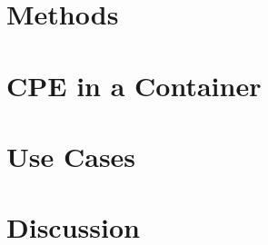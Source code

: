 \documentclass[conference]{IEEEtran}
\begin{document}
\section{Methods}
\label{sec:methods}


\section{CPE in a Container}
\label{sec:cpe}


\section{Use Cases}
\label{sec:usecases}


\section{Discussion}
\label{sec:discussion}





\end{document}
